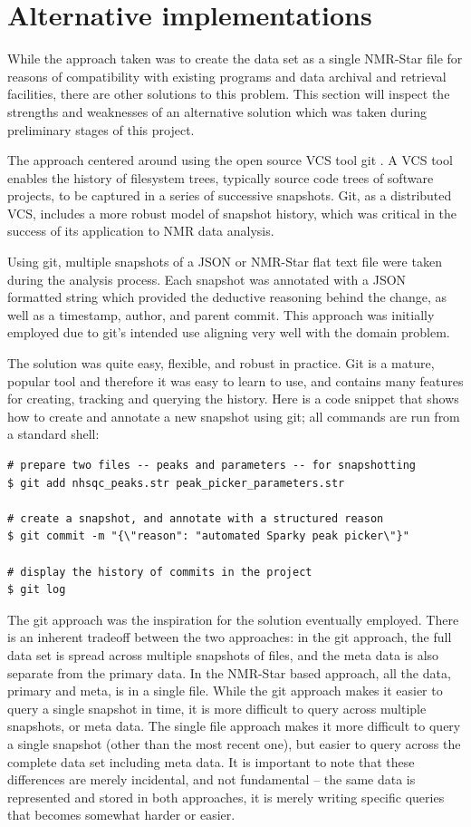 \section{Alternative implementations}

While the approach taken was to create the data set as a single NMR-Star
file for reasons of compatibility with existing programs and data archival
and retrieval facilities, there are other solutions to this problem.  This
section will inspect the strengths and weaknesses of an alternative solution
which was taken during preliminary stages of this project.

The approach centered around using the open source VCS tool git 
\cite{loeliger2012git}.  A VCS tool enables the history of filesystem trees,
typically source code trees of software projects, to be captured in a series
of successive snapshots.  Git, as a distributed VCS, includes a more robust
model of snapshot history, which was critical in the success of its 
application to NMR data analysis.

Using git, multiple snapshots of a JSON or NMR-Star flat text file were
taken during the analysis process.  Each snapshot was annotated with a 
JSON formatted string which provided the deductive reasoning behind the change,
as well as a timestamp, author, and parent commit.  This approach was initially
employed due to git's intended use aligning very well with the domain problem.

The solution was quite easy, flexible, and robust in practice.  Git is a mature,
popular tool and therefore it was easy to learn to use, and contains many
features for creating, tracking and querying the history.  Here is a code 
snippet that shows how to create and annotate a new snapshot using git; all
commands are run from a standard shell:
\begin{verbatim}
# prepare two files -- peaks and parameters -- for snapshotting
$ git add nhsqc_peaks.str peak_picker_parameters.str

# create a snapshot, and annotate with a structured reason
$ git commit -m "{\"reason": "automated Sparky peak picker\"}"

# display the history of commits in the project
$ git log
\end{verbatim}

The git approach was the inspiration for the solution eventually employed.
There is an inherent tradeoff between the two approaches: in the git approach,
the full data set is spread across multiple snapshots of files, and the meta
data is also separate from the primary data.  In the NMR-Star based approach,
all the data, primary and meta, is in a single file.  While the git approach
makes it easier to query a single snapshot in time, it is more difficult to
query across multiple snapshots, or meta data.  The single file approach makes
it more difficult to query a single snapshot (other than the most recent one),
but easier to query across the complete data set including meta data.  It is
important to note that these differences are merely incidental, and not 
fundamental -- the same data is represented and stored in both approaches, it
is merely writing specific queries that becomes somewhat harder or easier.

